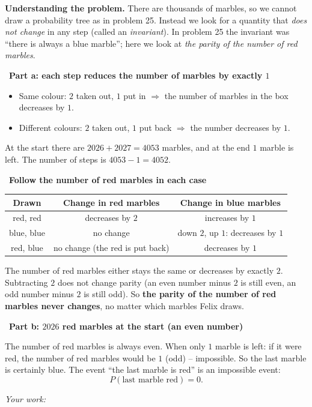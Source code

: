 \documentclass[11pt]{article}
\newif\ifsol \solfalse
\newcommand{\StuProb}[2]{\begin{probboxS}{#1}{#2}\StuProbBody\end{probboxS}}
\newcommand{\probsol}[1]{%
  \begin{lrbox}{\solmeasure}\begin{minipage}{\dimexpr\linewidth-24pt\relax}#1\end{minipage}\end{lrbox}%
  \ifsol
    \begin{solbox}#1\end{solbox}%
  \else
    \setlength{\solht}{\dimexpr\ht\solmeasure+\dp\solmeasure+0.85cm\relax}%
    \ifdim\solht<1.35cm\setlength{\solht}{1.35cm}\fi
    \ifdim\solht>\StudentMaxWork\setlength{\solht}{\StudentMaxWork}\fi
    \par\noindent\begin{minipage}{\linewidth}%
    \expandafter\StuProb\StuProbArgs
    \begin{tcolorbox}[colback=white,colframe=Line,boxrule=0.8pt,arc=5pt,
      left=8pt,right=8pt,top=4pt,bottom=4pt,height=\solht]{\footnotesize\color{Slate}\itshape\WorkWord}\end{tcolorbox}%
    \end{minipage}\par\medskip
  \fi}
\newlength{\StudentMaxWork}\setlength{\StudentMaxWork}{4.5cm}
\newcommand{\step}[2]{\par\smallskip\noindent{\bfseries\color{tmBlue!85!black}\StepWord~#1.}\ {\bfseries #2}\par\nopagebreak}
\def\WorkWord{Your work:}
\def\StepWord{Step}
\begin{document}
\probsol{
\textbf{Understanding the problem.} There are thousands of marbles, so we cannot draw a probability tree as in problem 25. Instead we look for
a quantity that \emph{does not change} in any step (called an \emph{invariant}). In problem 25 the invariant was ``there is always a blue
marble''; here we look at \emph{the parity of the number of red marbles}.

\step{1}{Part a: each step reduces the number of marbles by exactly $1$}
\begin{itemize}[leftmargin=1.2em,itemsep=1pt,topsep=2pt]
\item Same colour: $2$ taken out, $1$ put in $\Rightarrow$ the number of marbles in the box decreases by $1$.
\item Different colours: $2$ taken out, $1$ put back $\Rightarrow$ the number decreases by $1$.
\end{itemize}
At the start there are $2026+2027=4053$ marbles, and at the end $1$ marble is left. The number of steps is $4053-1=4052$.

\step{2}{Follow the number of red marbles in each case}
\begin{center}\begin{tabular}{|c|c|c|}\hline
Drawn & Change in red marbles & Change in blue marbles\\\hline
red, red & decreases by $2$ & increases by $1$\\\hline
blue, blue & no change & down $2$, up $1$: decreases by $1$\\\hline
red, blue & no change (the red is put back) & decreases by $1$\\\hline
\end{tabular}\end{center}
\begin{proofbox}The number of red marbles either stays the same or decreases by exactly $2$. Subtracting $2$ does not change parity (an even
number minus $2$ is still even, an odd number minus $2$ is still odd). So \textbf{the parity of the number of red marbles never changes}, no
matter which marbles Felix draws.\end{proofbox}

\step{3}{Part b: $2026$ red marbles at the start (an even number)}
The number of red marbles is always even. When only $1$ marble is left: if it were red, the number of red marbles would be $1$ (odd) --
impossible. So the last marble is certainly blue. The event ``the last marble is red'' is an impossible event:
\[P(\text{last marble red})=0.\]

}
\end{document}
